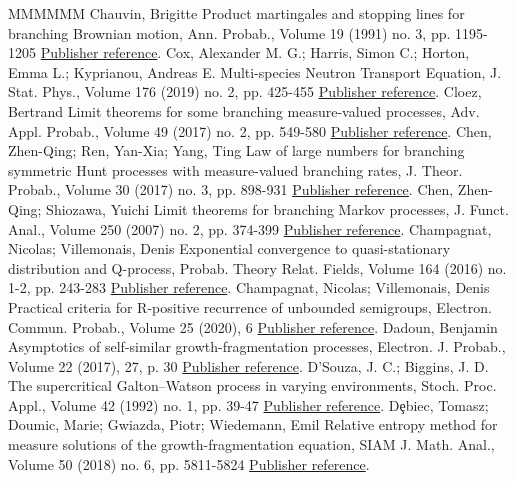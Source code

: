 \documentclass[11pt]{article}
\theoremstyle{definition}
\numberwithin{equation}{section}
\numberwithin{figure}{section}
\numberwithin{table}{section}
\begin{document}
\begin{thebibliography}{MMMMMM}
 Chauvin, Brigitte Product martingales and stopping lines for branching Brownian motion, Ann. Probab., Volume 19 (1991) no. 3, pp. 1195-1205 \href{https://ahl.centre-mersenne.org/item/AHL_2020__3__795_0/#Cha-stop}{Publisher reference}.
 Cox, Alexander M. G.; Harris, Simon C.; Horton, Emma L.; Kyprianou, Andreas E. Multi-species Neutron Transport Equation, J. Stat. Phys., Volume 176 (2019) no. 2, pp. 425-455 \href{https://ahl.centre-mersenne.org/item/AHL_2020__3__795_0/#CHHK}{Publisher reference}.
 Cloez, Bertrand Limit theorems for some branching measure-valued processes, Adv. Appl. Probab., Volume 49 (2017) no. 2, pp. 549-580 \href{https://ahl.centre-mersenne.org/item/AHL_2020__3__795_0/#Cloez}{Publisher reference}.
 Chen, Zhen-Qing; Ren, Yan-Xia; Yang, Ting Law of large numbers for branching symmetric Hunt processes with measure-valued branching rates, J. Theor. Probab., Volume 30 (2017) no. 3, pp. 898-931 \href{https://ahl.centre-mersenne.org/item/AHL_2020__3__795_0/#CRY}{Publisher reference}.
 Chen, Zhen-Qing; Shiozawa, Yuichi Limit theorems for branching Markov processes, J. Funct. Anal., Volume 250 (2007) no. 2, pp. 374-399 \href{https://ahl.centre-mersenne.org/item/AHL_2020__3__795_0/#ChYu}{Publisher reference}.
 Champagnat, Nicolas; Villemonais, Denis Exponential convergence to quasi-stationary distribution and Q-process, Probab. Theory Relat. Fields, Volume 164 (2016) no. 1-2, pp. 243-283 \href{https://ahl.centre-mersenne.org/item/AHL_2020__3__795_0/#ChVil}{Publisher reference}.
 Champagnat, Nicolas; Villemonais, Denis Practical criteria for R-positive recurrence of unbounded semigroups, Electron. Commun. Probab., Volume 25 (2020), 6 \href{https://ahl.centre-mersenne.org/item/AHL_2020__3__795_0/#CV-unbounded}{Publisher reference}.
 Dadoun, Benjamin Asymptotics of self-similar growth-fragmentation processes, Electron. J. Probab., Volume 22 (2017), 27, p. 30 \href{https://ahl.centre-mersenne.org/item/AHL_2020__3__795_0/#Dadoun}{Publisher reference}.
 D’Souza, J. C.; Biggins, J. D. The supercritical Galton–Watson process in varying environments, Stoch. Proc. Appl., Volume 42 (1992) no. 1, pp. 39-47 \href{https://ahl.centre-mersenne.org/item/AHL_2020__3__795_0/#DB-bpre}{Publisher reference}.
 Dȩbiec, Tomasz; Doumic, Marie; Gwiazda, Piotr; Wiedemann, Emil Relative entropy method for measure solutions of the growth-fragmentation equation, SIAM J. Math. Anal., Volume 50 (2018) no. 6, pp. 5811-5824 \href{https://ahl.centre-mersenne.org/item/AHL_2020__3__795_0/#DDGW}{Publisher reference}.

\end{thebibliography}
\end{document}
